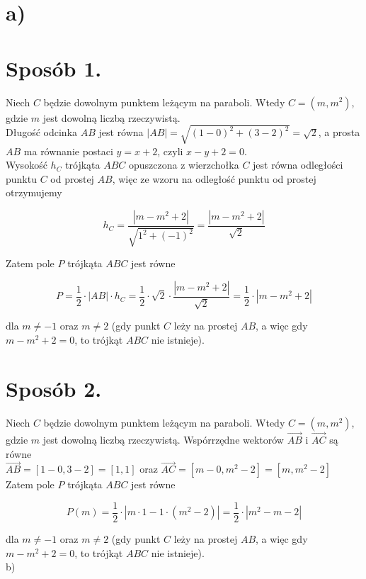 \documentclass[10pt]{article}
\begin{document}
\section*{a)}
\section*{Sposób 1.}
Niech $C$ będzie dowolnym punktem leżącym na paraboli. Wtedy $C=\left(m, m^{2}\right)$, gdzie $m$ jest dowolną liczbą rzeczywistą.\\
Długość odcinka $A B$ jest równa $|A B|=\sqrt{(1-0)^{2}+(3-2)^{2}}=\sqrt{2}$, a prosta $A B$ ma równanie postaci $y=x+2$, czyli $x-y+2=0$.\\
Wysokość $h_{C}$ trójkąta $A B C$ opuszczona z wierzchołka $C$ jest równa odległości punktu $C$ od prostej $A B$, więc ze wzoru na odległość punktu od prostej otrzymujemy

$$
h_{C}=\frac{\left|m-m^{2}+2\right|}{\sqrt{1^{2}+(-1)^{2}}}=\frac{\left|m-m^{2}+2\right|}{\sqrt{2}}
$$

Zatem pole $P$ trójkąta $A B C$ jest równe

$$
P=\frac{1}{2} \cdot|A B| \cdot h_{C}=\frac{1}{2} \cdot \sqrt{2} \cdot \frac{\left|m-m^{2}+2\right|}{\sqrt{2}}=\frac{1}{2} \cdot\left|m-m^{2}+2\right|
$$

dla $m \neq-1$ oraz $m \neq 2$ (gdy punkt $C$ leży na prostej $A B$, a więc gdy $m-m^{2}+2=0$, to trójkąt $A B C$ nie istnieje).

\section*{Sposób 2.}
Niech $C$ będzie dowolnym punktem leżącym na paraboli. Wtedy $C=\left(m, m^{2}\right)$, gdzie $m$ jest dowolną liczbą rzeczywistą. Wspórrzędne wektorów $\overrightarrow{A B}$ i $\overrightarrow{A C}$ są równe\\
$\overrightarrow{A B}=[1-0,3-2]=[1,1]$ oraz $\overrightarrow{A C}=\left[m-0, m^{2}-2\right]=\left[m, m^{2}-2\right]$\\
Zatem pole $P$ trójkąta $A B C$ jest równe

$$
P(m)=\frac{1}{2} \cdot\left|m \cdot 1-1 \cdot\left(m^{2}-2\right)\right|=\frac{1}{2} \cdot\left|m^{2}-m-2\right|
$$

dla $m \neq-1$ oraz $m \neq 2$ (gdy punkt $C$ leży na prostej $A B$, a więc gdy $m-m^{2}+2=0$, to trójkąt $A B C$ nie istnieje).\\
b)
\end{document}
